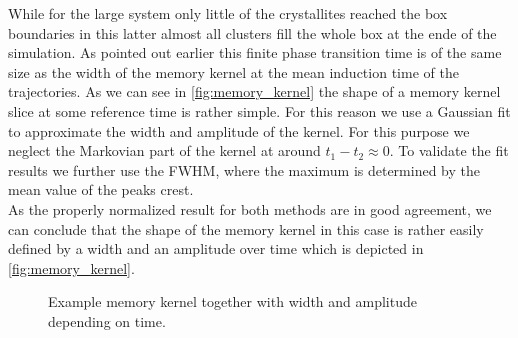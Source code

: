 While for the large system only little of the crystallites reached the box boundaries in this latter almost all clusters fill the whole box at the ende of the simulation. As pointed out earlier this finite phase transition time is of the same size as the width of the memory kernel at the mean induction time of the trajectories. As we can see in \autoref{fig:memory_kernel} the shape of a memory kernel slice at some reference time is rather simple. For this reason we use a Gaussian fit to approximate the width and amplitude of the kernel. For this purpose we neglect the Markovian part of the kernel at around $t_1-t_2 \approx 0$. To validate the fit results we further use the FWHM, where the maximum is determined by the mean value of the peaks crest.\\
As the properly normalized result for both methods are in good agreement, we can conclude that the shape of the memory kernel in this case is rather easily defined by a width and an amplitude over time which is depicted in \autoref{fig:memory_kernel}.


\begin{figure}[ht]
\begin{center}
 \hspace{0.5cm}
\caption[Width and amplitude of memory kernel with one example slice]{Example memory kernel together with width and amplitude depending on time.}
\label{fig:memory_kernel}
\end{center}
\end{figure}

